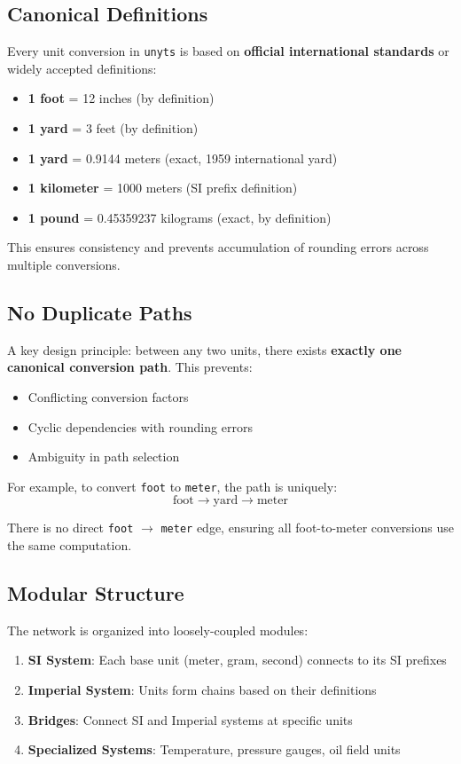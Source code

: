 \documentclass[11pt,a4paper]{report}
\begin{document}
\subsection{Canonical Definitions}

Every unit conversion in \texttt{unyts} is based on \textbf{official international standards} or widely accepted definitions:

\begin{itemize}[leftmargin=*]
  \item \textbf{1 foot} = 12 inches (by definition)
  \item \textbf{1 yard} = 3 feet (by definition)
  \item \textbf{1 yard} = 0.9144 meters (exact, 1959 international yard)
  \item \textbf{1 kilometer} = 1000 meters (SI prefix definition)
  \item \textbf{1 pound} = 0.45359237 kilograms (exact, by definition)
\end{itemize}

This ensures consistency and prevents accumulation of rounding errors across multiple conversions.

\subsection{No Duplicate Paths}

A key design principle: between any two units, there exists \textbf{exactly one canonical conversion path}. This prevents:
\begin{itemize}[leftmargin=*]
  \item Conflicting conversion factors
  \item Cyclic dependencies with rounding errors
  \item Ambiguity in path selection
\end{itemize}

For example, to convert \texttt{foot} to \texttt{meter}, the path is uniquely:
\[
\text{foot} \rightarrow \text{yard} \rightarrow \text{meter}
\]

There is no direct \texttt{foot} $\rightarrow$ \texttt{meter} edge, ensuring all foot-to-meter conversions use the same computation.

\subsection{Modular Structure}

The network is organized into loosely-coupled modules:
\begin{enumerate}[leftmargin=*]
  \item \textbf{SI System}: Each base unit (meter, gram, second) connects to its SI prefixes
  \item \textbf{Imperial System}: Units form chains based on their definitions
  \item \textbf{Bridges}: Connect SI and Imperial systems at specific units
  \item \textbf{Specialized Systems}: Temperature, pressure gauges, oil field units
\end{enumerate}
\end{document}
